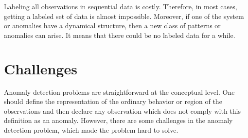 Labeling all observations in sequential data is costly.
Therefore, in most cases, getting a labeled set of data is almost impossible.
Moreover, if one of the system or anomalies have a dynamical structure, then a new class of patterns or anomalies can arise.
It means that there could be no labeled data for a while.

\section{Challenges}

Anomaly detection problems are straightforward at the conceptual level. 
One should define the representation of the ordinary behavior or region of the observations and then declare any observation which does not comply with this definition as an anomaly. 
However, there are some challenges in the anomaly detection problem, which made the problem hard to solve.

